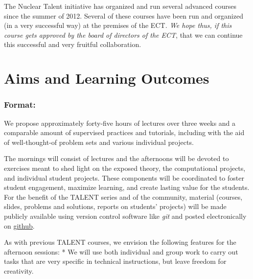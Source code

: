 \documentclass[twocolumn,superscriptaddress,amsmath,amssymb,
aps,floatfix]{revtex4-2}
\begin{document}
The Nuclear Talent initiative has organized and run several advanced
courses since the summer of 2012. Several of these courses have been run
and organized (in a very successful way) at the premises of the
ECT\emph{. We hope thus, if this course gets approved by the board of
directors of the ECT}, that we can continue this successful and very
fruitful collaboration.

    \section{Aims and Learning
Outcomes}\label{aims-and-learning-outcomes}

    \subsubsection{Format:}\label{format}

We propose approximately forty-five hours of lectures over three weeks
and a comparable amount of 
supervised practices and tutorials,
including 
with the aid of well-thought-of problem sets and 
various individual projects.

The mornings will consist of lectures and the afternoons will be devoted
to exercises meant to shed light on the exposed theory, the
computational projects, and individual student projects. These components
will be coordinated to foster student engagement, maximize learning, and
create lasting value for the students. For the benefit of the TALENT
series and of the community, material (courses, slides, problems and
solutions, reports on students' projects) will be made publicly
available using version control software like \emph{git} and posted
electronically on \href{https://github.com}{github}.

As with previous TALENT courses, we envision the following features for
the afternoon sessions: * We will use both individual and group work to
carry out tasks that are very specific in technical instructions, but
leave freedom for creativity.
\end{document}
